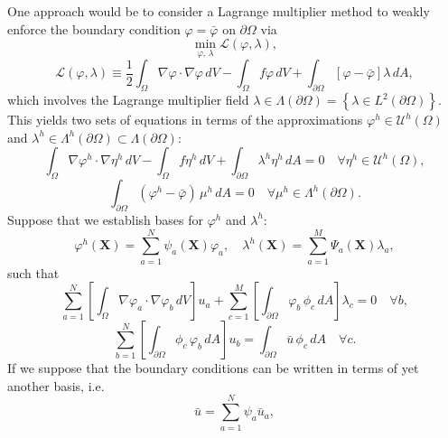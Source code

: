 	One approach would be to consider a Lagrange multiplier method to weakly enforce the boundary condition $\varphi = \bar{\varphi}$ on $\partial \Omega$ via
	\begin{equation}
		\min_{\varphi, \, \lambda} \mathcal{L}(\varphi,\lambda),
	\end{equation}
	\begin{equation}
	\mathcal{L}(\varphi,\lambda) \equiv \frac{1}{2} \int_{\Omega} \nabla \varphi \cdot \nabla \varphi \, dV - \int_{\Omega} f \varphi \, dV + \int_{\partial \Omega} \left[ \varphi - \bar{\varphi} \right] \lambda \, dA,
\end{equation}
	which involves the Lagrange multiplier field $\lambda \in \Lambda (\partial \Omega) = \left\{ \lambda \in L^2 (\partial \Omega) \right\}$. This yields two sets of equations in terms of the approximations $\varphi^h \in \mathcal{U}^h (\Omega)$ and $\lambda^h \in \Lambda^h (\partial \Omega) \subset \Lambda (\partial \Omega)$:
	\begin{equation}
		\int_{\Omega} \nabla \varphi^h \cdot \nabla \eta^h \, dV - \int_\Omega f \eta^h \, dV + \int_{\partial \Omega} \lambda^h \eta^h \, dA = 0 \quad \forall \eta^h \in \mathcal{U}^h (\Omega),
	\end{equation}
	\begin{equation}
		\int_{\partial \Omega} (\varphi^h - \bar{\varphi}) \, \mu^h \, dA = 0 \quad \forall \mu^h \in \Lambda^h (\partial \Omega).
	\end{equation}
	Suppose that we establish bases for $\varphi^h$ and $\lambda^h$:
\begin{equation}
	\varphi^h (\mathbf{X}) = \sum_{a=1}^{N} \psi_a (\mathbf{X}) \varphi_a, \quad \lambda^h (\mathbf{X}) = \sum_{a=1}^{M} \Psi_a (\mathbf{X}) \lambda_a,
\end{equation}
such that
\begin{equation}
	\sum_{a=1}^N \left[ \int_{\Omega} \nabla \varphi_a \cdot \nabla \varphi_b \, dV \right] u_a + \sum_{c=1}^M \left[ \int_{\partial \Omega} \varphi_b \, \phi_c \, dA \right] \lambda_c = 0 \quad \forall b,
\end{equation}
\begin{equation}
	\sum_{b=1}^N \left[ \int_{\partial \Omega} \phi_c \, \varphi_b \, dA \right] u_b = \int_{\partial \Omega} \bar{u} \, \phi_c \, dA \quad \forall c.
\end{equation}
If we suppose that the boundary conditions can be written in terms of yet another basis, i.e.
\begin{equation}
	\bar{u} = \sum_{a=1}^N \psi_a \bar{u}_a,
\end{equation}
